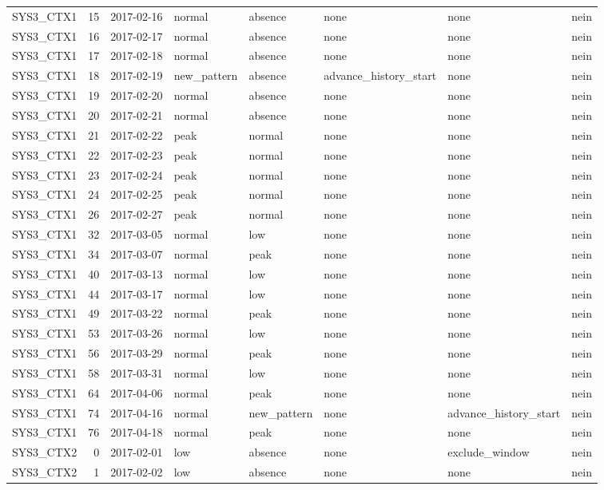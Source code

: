 \begin{tabular}{lrllllll}
SYS3\_CTX1 & 15 & 2017-02-16 & normal & absence & none & none & nein \\
SYS3\_CTX1 & 16 & 2017-02-17 & normal & absence & none & none & nein \\
SYS3\_CTX1 & 17 & 2017-02-18 & normal & absence & none & none & nein \\
SYS3\_CTX1 & 18 & 2017-02-19 & new\_pattern & absence & advance\_history\_start & none & nein \\
SYS3\_CTX1 & 19 & 2017-02-20 & normal & absence & none & none & nein \\
SYS3\_CTX1 & 20 & 2017-02-21 & normal & absence & none & none & nein \\
SYS3\_CTX1 & 21 & 2017-02-22 & peak & normal & none & none & nein \\
SYS3\_CTX1 & 22 & 2017-02-23 & peak & normal & none & none & nein \\
SYS3\_CTX1 & 23 & 2017-02-24 & peak & normal & none & none & nein \\
SYS3\_CTX1 & 24 & 2017-02-25 & peak & normal & none & none & nein \\
SYS3\_CTX1 & 26 & 2017-02-27 & peak & normal & none & none & nein \\
SYS3\_CTX1 & 32 & 2017-03-05 & normal & low & none & none & nein \\
SYS3\_CTX1 & 34 & 2017-03-07 & normal & peak & none & none & nein \\
SYS3\_CTX1 & 40 & 2017-03-13 & normal & low & none & none & nein \\
SYS3\_CTX1 & 44 & 2017-03-17 & normal & low & none & none & nein \\
SYS3\_CTX1 & 49 & 2017-03-22 & normal & peak & none & none & nein \\
SYS3\_CTX1 & 53 & 2017-03-26 & normal & low & none & none & nein \\
SYS3\_CTX1 & 56 & 2017-03-29 & normal & peak & none & none & nein \\
SYS3\_CTX1 & 58 & 2017-03-31 & normal & low & none & none & nein \\
SYS3\_CTX1 & 64 & 2017-04-06 & normal & peak & none & none & nein \\
SYS3\_CTX1 & 74 & 2017-04-16 & normal & new\_pattern & none & advance\_history\_start & nein \\
SYS3\_CTX1 & 76 & 2017-04-18 & normal & peak & none & none & nein \\
SYS3\_CTX2 & 0 & 2017-02-01 & low & absence & none & exclude\_window & nein \\
SYS3\_CTX2 & 1 & 2017-02-02 & low & absence & none & none & nein \\

\end{tabular}
